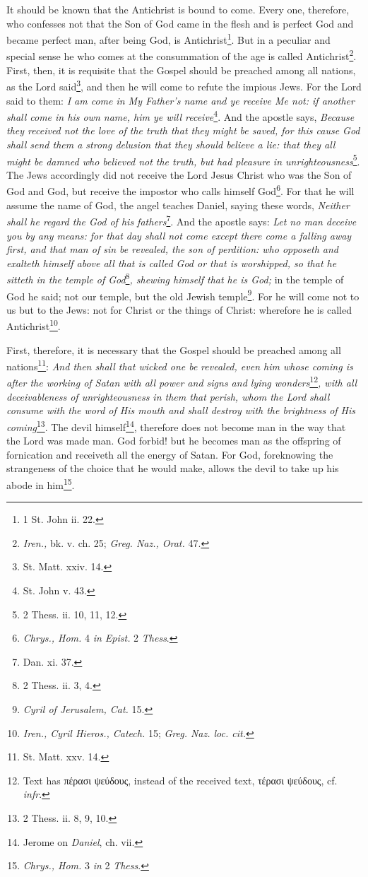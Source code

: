 It should be known that the Antichrist is bound to come. Every one, therefore, who confesses not that the Son of God came in the flesh and is perfect God and became perfect man, after being God, is Antichrist\footnote{1 St. John ii. 22.}. But in a peculiar and special sense he who comes at the consummation of the age is called Antichrist\footnote{\emph{Iren.,} bk. v. ch. 25; \emph{Greg. Naz., Orat. }47.}. First, then, it is requisite that the Gospel should be preached among all nations, as the Lord said\footnote{St. Matt. xxiv. 14.}, and then he will come to refute the impious Jews. For the Lord said to them: \emph{I am come in My Father’s name and ye receive Me not: if another shall come in his own name, him ye will receive}\footnote{St. John v. 43.}. And the apostle says, \emph{Because they received not the love of the truth that they might be saved, for this cause God shall send them a strong delusion that they should believe a lie: that they all might be damned who believed not the truth, but had pleasure in unrighteousness}\footnote{2 Thess. ii. 10, 11, 12.}. The Jews accordingly did not receive the Lord Jesus Christ who was the Son of God and God, but receive the impostor who calls himself God\footnote{\emph{Chrys., Hom. }4 \emph{in Epist. }2 \emph{Thess}.}. For that he will assume the name of God, the angel teaches Daniel, saying these words, \emph{Neither shall he regard the God of his fathers}\footnote{Dan. xi. 37.}. And the apostle says: \emph{Let no man deceive you by any means: for that day shall not come except there come a falling away first, and that man of sin be revealed, the son of perdition: who opposeth and exalteth himself above all that is called God or that is worshipped, so that he sitteth in the temple of God}\footnote{2 Thess. ii. 3, 4.}\emph{, shewing himself that he is God; }in the temple of God he said; not our temple, but the old Jewish temple\footnote{\emph{Cyril of Jerusalem, Cat. }15.}. For he will come not to us but to the Jews: not for Christ or the things of Christ: wherefore he is called Antichrist\footnote{\emph{Iren., Cyril Hieros., Catech. }15; \emph{Greg. Naz. loc. cit.}}.

First, therefore, it is necessary that the Gospel should be preached among all nations\footnote{St. Matt. xxv. 14.}: \emph{And then shall that wicked one be }\emph{revealed, even him whose coming is after the working of Satan with all power and signs and lying wonders}\footnote{Text has \textgreek{πέρασι ψεύδους}, instead of the received text, \textgreek{τέρασι ψεύδους}, cf. \emph{infr}.}\emph{, with all deceivableness of unrighteousness in them that perish, whom the Lord shall consume with the word of His mouth and shall destroy with the brightness of His coming}\footnote{2 Thess. ii. 8, 9, 10.}. The devil himself\footnote{Jerome on \emph{Daniel}, ch. vii.}, therefore does not become man in the way that the Lord was made man. God forbid! but he becomes man as the offspring of fornication and receiveth all the energy of Satan. For God, foreknowing the strangeness of the choice that he would make, allows the devil to take up his abode in him\footnote{\emph{Chrys., Hom. }3 \emph{in }2 \emph{Thess}.}.


